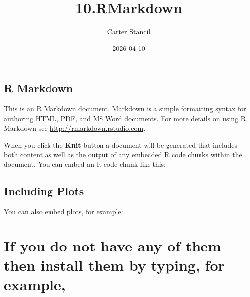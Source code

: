 \documentclass[
]{article}
\title{10.RMarkdown}
\author{Carter Stancil}
\date{2026-04-10}
\newenvironment{Shaded}{\begin{snugshade}}{\end{snugshade}}
\newcommand{\AttributeTok}[1]{\textcolor[rgb]{0.13,0.29,0.53}{#1}}
\newcommand{\CommentTok}[1]{\textcolor[rgb]{0.56,0.35,0.01}{\textit{#1}}}
\newcommand{\DocumentationTok}[1]{\textcolor[rgb]{0.56,0.35,0.01}{\textbf{\textit{#1}}}}
\newcommand{\FunctionTok}[1]{\textcolor[rgb]{0.13,0.29,0.53}{\textbf{#1}}}
\newcommand{\NormalTok}[1]{#1}
\newcommand{\SpecialCharTok}[1]{\textcolor[rgb]{0.81,0.36,0.00}{\textbf{#1}}}
\newcommand{\StringTok}[1]{\textcolor[rgb]{0.31,0.60,0.02}{#1}}
\begin{document}
\maketitle

\subsection{R Markdown}\label{r-markdown}

This is an R Markdown document. Markdown is a simple formatting syntax
for authoring HTML, PDF, and MS Word documents. For more details on
using R Markdown see \url{http://rmarkdown.rstudio.com}.

When you click the \textbf{Knit} button a document will be generated
that includes both content as well as the output of any embedded R code
chunks within the document. You can embed an R code chunk like this:

\subsection{Including Plots}\label{including-plots}

You can also embed plots, for example:

\begin{Shaded}
\end{Shaded}

\section{If you do not have any of them then install them by typing, for
example,}\label{if-you-do-not-have-any-of-them-then-install-them-by-typing-for-example}
\end{document}
